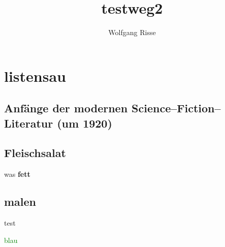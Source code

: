 \documentclass[12pt,a4paper]{report}
\author{Wolfgang Risse}
\title{testweg2}
\begin{document}
\tableofcontents
\setcounter{tocdepth}{-1}
\part{listensau}
\chapter[Anfänge (1920)]{Anfänge der modernen Science--Fiction--Literatur (um 1920)}
\chapter{Fleischsalat}
was
\textbf{fett}
\chapter{malen}
test\\
\textcolor{green}{blau}
\end{document}
